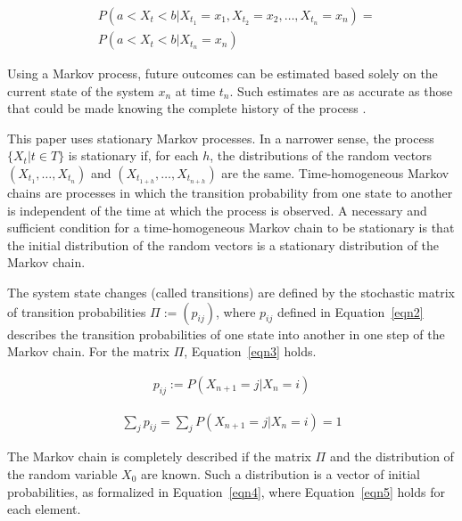 \documentclass[preprint,12pt]{elsarticle}
\begin{document}
\begin{equation} \label{eqn1}
    \begin{aligned}
        & P(a<X_{t}<b|X_{t_{1}}=x_{1}, X_{t_{2}}=x_{2}, \dots, X_{t_{n}}=x_{n}) = \\
     &P(a<X_{t}<b|X_{t_{n}}=x_{n})  
    \end{aligned}
\end{equation}  

Using a Markov process, future outcomes can be estimated based solely on the current state of the system $x_{n}$ at time $t_{n}$. Such estimates are as accurate as those that could be made knowing the complete history of the process \citep{citeulike:1220946}.

This paper uses stationary Markov processes. In a narrower sense, the process $\{X_{t}|t\in T\}$ is stationary if, for each $h$, the distributions of the random vectors $(X_{t_{1}}, \dots, X_{t_{n}})$ and $(X_{t_{1 + h}}, \dots, X_{t_{n + h}})$ are the same. Time-homogeneous Markov chains are processes in which the transition probability from one state to another is independent of the time at which the process is observed. A necessary and sufficient condition for a time-homogeneous Markov chain to be stationary \citep{Gagniuc2017-jf} is that the initial distribution of the random vectors is a stationary distribution of the Markov chain.

The system state changes  (called transitions) \citep{Gagniuc} are defined by the stochastic matrix of transition probabilities $\Pi:=(p_{ij})$, where $p_{ij}$ defined in Equation~\ref{eqn2} describes the transition probabilities of one state into another in one step of the Markov chain. For the matrix $\Pi$, Equation~\ref{eqn3} holds.

\begin{equation} \label{eqn2}
    \begin{aligned}
       p_{ij}:=P(X_{n+1}=j|X_{n}=i)
    \end{aligned}
\end{equation}  

\begin{equation} \label{eqn3}
    \begin{aligned}
        \sum_{j}p_{ij}=\sum_{j}P(X_{n+1}=j|X_{n}=i)=1
    \end{aligned}
\end{equation}   

The Markov chain is completely described if the matrix $\Pi$ and the distribution of the random variable $X_{0}$ are known. Such a distribution is a vector of initial probabilities, as formalized in Equation~\ref{eqn4}, where Equation~\ref{eqn5} holds for each element.
  
\end{document}
